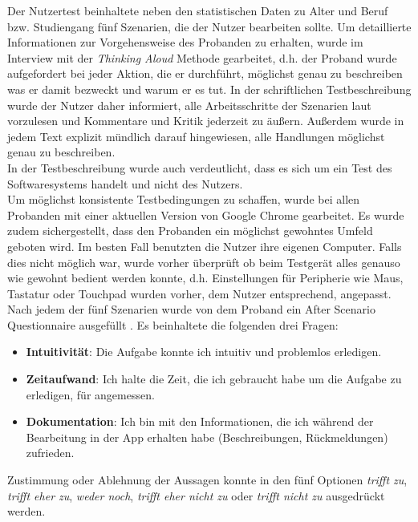 Der Nutzertest beinhaltete neben den statistischen Daten zu Alter und Beruf bzw. Studiengang fünf Szenarien, die der Nutzer bearbeiten sollte. Um detaillierte Informationen zur Vorgehensweise des Probanden zu erhalten, wurde im Interview mit der \textit{Thinking Aloud} Methode gearbeitet, d.h. der Proband wurde aufgefordert bei jeder Aktion, die er durchführt, möglichst genau zu beschreiben was er damit bezweckt und warum er es tut.  In der schriftlichen Testbeschreibung wurde der Nutzer daher informiert, alle Arbeitsschritte der Szenarien laut vorzulesen und Kommentare und Kritik jederzeit zu äußern. Außerdem wurde in jedem Text explizit mündlich darauf hingewiesen, alle Handlungen möglichst genau zu beschreiben.\\
In der Testbeschreibung wurde auch verdeutlicht, dass es sich um ein Test des Softwaresystems handelt und nicht des Nutzers. \\

Um möglichst konsistente Testbedingungen zu schaffen, wurde bei allen Probanden mit einer aktuellen Version von Google Chrome gearbeitet. Es wurde zudem sichergestellt, dass den Probanden ein möglichst gewohntes Umfeld geboten wird. Im besten Fall benutzten die Nutzer ihre eigenen Computer. Falls dies nicht möglich war, wurde vorher überprüft ob beim Testgerät alles genauso wie gewohnt bedient werden konnte, d.h. Einstellungen für Peripherie wie Maus, Tastatur oder Touchpad wurden vorher, dem Nutzer entsprechend, angepasst.\\

Nach jedem der fünf Szenarien wurde von dem Proband ein After Scenario Questionnaire ausgefüllt . Es beinhaltete die folgenden drei Fragen:
\begin{itemize}
	\item \textbf{Intuitivität}: Die Aufgabe konnte ich intuitiv und problemlos erledigen.
	\item \textbf{Zeitaufwand}: Ich halte die Zeit, die ich gebraucht habe um die Aufgabe zu erledigen, für angemessen.
	\item \textbf{Dokumentation}: Ich bin mit den Informationen, die ich während der Bearbeitung in der App erhalten habe (Beschreibungen, Rückmeldungen) zufrieden.
\end{itemize}

Zustimmung oder Ablehnung der Aussagen konnte in den fünf Optionen \textit{trifft zu}, \textit{trifft eher zu}, \textit{weder noch}, \textit{trifft eher nicht zu} oder \textit{trifft nicht zu} ausgedrückt werden.

